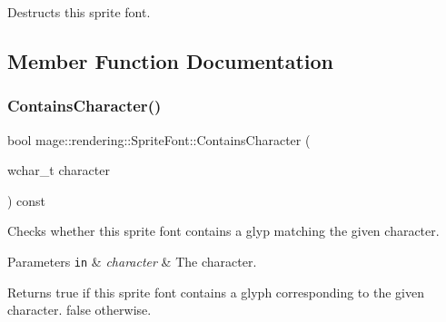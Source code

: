 Destructs this sprite font. 

\subsection{Member Function Documentation}
\mbox{\label{classmage_1_1rendering_1_1_sprite_font_a6f9adb6806acc990ac3feaa547f7f296}} 
\subsubsection{\texorpdfstring{Contains\+Character()}{ContainsCharacter()}}
{\footnotesize\ttfamily bool mage\+::rendering\+::\+Sprite\+Font\+::\+Contains\+Character (\begin{DoxyParamCaption}\item[{wchar\+\_\+t}]{character }\end{DoxyParamCaption}) const}

Checks whether this sprite font contains a glyp matching the given character.


\begin{DoxyParams}[1]{Parameters}
\mbox{\tt in}  & {\em character} & The character. \\
\hline
\end{DoxyParams}
\begin{DoxyReturn}{Returns}
{\ttfamily true} if this sprite font contains a glyph corresponding to the given character. {\ttfamily false} otherwise. 
\end{DoxyReturn}
\mbox{\label{classmage_1_1rendering_1_1_sprite_font_a0be6671c77a11df1e11a7a1568caeb68}} 
